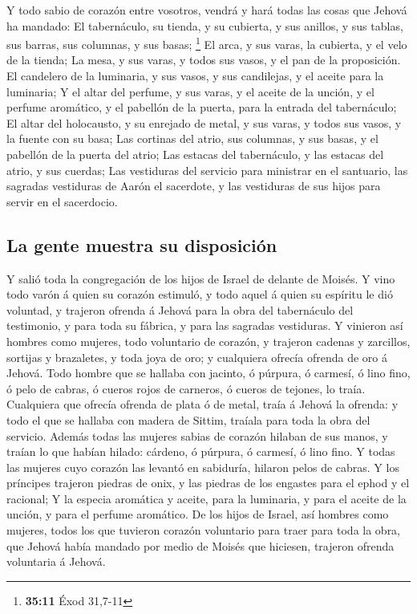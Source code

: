  Y todo sabio de corazón entre vosotros, vendrá y hará
todas las cosas que Jehová ha mandado:  El tabernáculo, su
tienda, y su cubierta, y sus anillos, y sus tablas, sus barras, sus
columnas, y sus basas; \footnote{\textbf{35:11} Éxod 31,7-11}
 El arca, y sus varas, la cubierta, y el velo de la tienda;
 La mesa, y sus varas, y todos sus vasos, y el pan de la
proposición.  El candelero de la luminaria, y sus vasos, y
sus candilejas, y el aceite para la luminaria;  Y el altar
del perfume, y sus varas, y el aceite de la unción, y el perfume
aromático, y el pabellón de la puerta, para la entrada del tabernáculo;
 El altar del holocausto, y su enrejado de metal, y sus
varas, y todos sus vasos, y la fuente con su basa;  Las
cortinas del atrio, sus columnas, y sus basas, y el pabellón de la
puerta del atrio;  Las estacas del tabernáculo, y las
estacas del atrio, y sus cuerdas;  Las vestiduras del
servicio para ministrar en el santuario, las sagradas vestiduras de
Aarón el sacerdote, y las vestiduras de sus hijos para servir en el
sacerdocio.

\hypertarget{la-gente-muestra-su-disposiciuxf3n}{%
\subsection{La gente muestra su
disposición}\label{la-gente-muestra-su-disposiciuxf3n}}

 Y salió toda la congregación de los hijos de Israel de
delante de Moisés.  Y vino todo varón á quien su corazón
estimuló, y todo aquel á quien su espíritu le dió voluntad, y trajeron
ofrenda á Jehová para la obra del tabernáculo del testimonio, y para
toda su fábrica, y para las sagradas vestiduras.  Y
vinieron así hombres como mujeres, todo voluntario de corazón, y
trajeron cadenas y zarcillos, sortijas y brazaletes, y toda joya de oro;
y cualquiera ofrecía ofrenda de oro á Jehová.  Todo hombre
que se hallaba con jacinto, ó púrpura, ó carmesí, ó lino fino, ó pelo de
cabras, ó cueros rojos de carneros, ó cueros de tejones, lo traía.
 Cualquiera que ofrecía ofrenda de plata ó de metal, traía
á Jehová la ofrenda: y todo el que se hallaba con madera de Sittim,
traíala para toda la obra del servicio.  Además todas las
mujeres sabias de corazón hilaban de sus manos, y traían lo que habían
hilado: cárdeno, ó púrpura, ó carmesí, ó lino fino.  Y
todas las mujeres cuyo corazón las levantó en sabiduría, hilaron pelos
de cabras.  Y los príncipes trajeron piedras de onix, y las
piedras de los engastes para el ephod y el racional;  Y la
especia aromática y aceite, para la luminaria, y para el aceite de la
unción, y para el perfume aromático.  De los hijos de
Israel, así hombres como mujeres, todos los que tuvieron corazón
voluntario para traer para toda la obra, que Jehová había mandado por
medio de Moisés que hiciesen, trajeron ofrenda voluntaria á Jehová.

